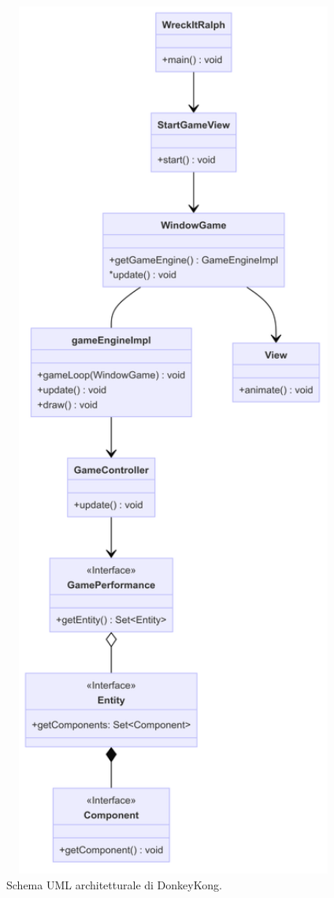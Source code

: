\begin{figure}[H]
\centering{}
\includegraphics[width=1.25\textwidth]{img/architettura.png}
\caption{Schema UML architetturale di DonkeyKong.}
\label{img:architettura}
\end{figure}

